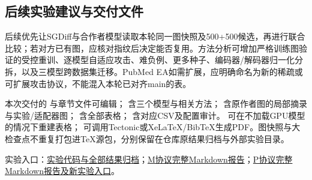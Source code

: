 \subsection{后续实验建议与交付文件}
后续优先让SGDiff与合作者模型读取本轮同一图快照及500+500候选，再进行联合比较；若对方已有图，应核对指纹后决定能否复用。方法分析可增加严格训练图验证的受控重训、逐模型自适应攻击、难负例、更多种子、编码器/解码器归一化分拆，以及三模型跨数据集迁移。PubMed EA如需扩展，应明确命名为新的稀疏或可扩展攻击协议，不能混入本轮已对齐main的表。

本次交付的  与章节文件可编辑； 含三个模型与相关方法； 含原作者图的局部摘录与实验/适配器图； 含全部表格； 含对应CSV及配置审计。 可在不加载GPU模型的情况下重建表格； 可调用Tectonic或XeLaTeX/BibTeX生成PDF。图快照与大检查点不重复打包进TeX源包，分别保留在仓库原结果归档与外部实验目录。

\noindent 实验入口：\href{https://github.com/2ira/sgdiff-repo/tree/feat/ncnc-lpformer-refined-gae/experiments/new_link_models}{实验代码与全部结果归档}；\href{https://github.com/2ira/sgdiff-repo/blob/feat/ncnc-lpformer-refined-gae/experiments/new_link_models/benchmarks/repository_protocol/report.md}{M协议完整Markdown报告}；\href{https://github.com/2ira/sgdiff-repo/blob/feat/ncnc-lpformer-refined-gae/experiments/new_link_models/benchmarks/report.md}{P协议完整Markdown报告及新实验入口}。
